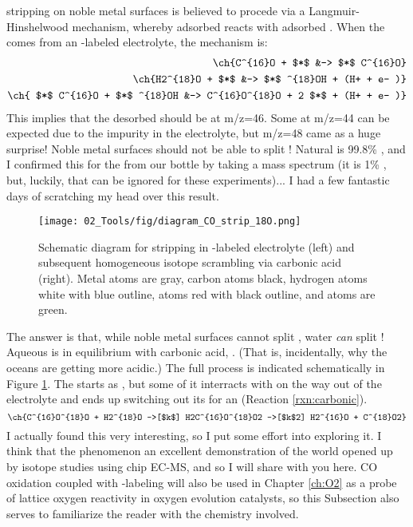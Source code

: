 stripping on noble metal surfaces is believed to procede via a Langmuir-Hinshelwood mechanism\cite{Mayrhofer2005, Koper2009}, whereby adsorbed  reacts with adsorbed . When the  comes from an -labeled electrolyte, the mechanism is:
\begin{align}
\ch{C^{16}O + $*$ &-> $*$ C^{16}O}\\
\ch{H2^{18}O + $*$ &-> $*$ ^{18}OH + (H+ + e- )}\\
\ch{ $*$ C^{16}O +  $*$ ^{18}OH &-> C^{16}O^{18}O + 2 $*$ + (H+ + e- )}
\end{align}
This implies that the  desorbed should be  at m/z=46. Some  at m/z=44 can be expected due to the  impurity in the electrolyte, but m/z=48 came as a huge surprise! Noble metal surfaces should not be able to split \cite{Bernasek1975}!  Natural  is 99.8\% , and I confirmed this for the  from our bottle by taking a mass spectrum (it is 1\% , but, luckily, that can be ignored for these experiments)... I had a few fantastic days of scratching my head over this result.
\begin{figure}[h!]
	\centering
	\texttt{[image: 02\_Tools/fig/diagram\_CO\_strip\_18O.png]}
	\caption{Schematic diagram for  stripping in -labeled electrolyte (left) and subsequent homogeneous isotope scrambling via carbonic acid (right). Metal atoms are gray, carbon atoms black, hydrogen atoms white with blue outline,  atoms red with black outline, and  atoms are green.}
	\label{fig:diagram_CO_18O}
\end{figure}
The answer is that, while noble metal surfaces cannot split , water \textit{can} split ! Aqueous  is in equilibrium with carbonic acid, . (That is, incidentally, why the oceans are getting more acidic.) The full process is indicated schematically in Figure \ref{fig:diagram_CO_18O}. The  starts as , but some of it interracts with  on the way out of the electrolyte and ends up switching out its  for an  (Reaction \ref{rxn:carbonic}).
\begin{equation}
\ch{C^{16}O^{18}O + H2^{18}O ->[$k$] H2C^{16}O^{18}O2 ->[$k$2] H2^{16}O + C^{18}O2}\label{rxn:carbonic}
\end{equation}
I actually found this very interesting, so I put some effort into exploring it. I think that the phenomenon an excellent demonstration of the world opened up by isotope studies using chip EC-MS, and so I will share with you here. CO oxidation coupled with -labeling will also be used in Chapter \ref{ch:O2} as a probe of lattice oxygen reactivity in oxygen evolution catalysts, so this Subsection also serves to familiarize the reader with the chemistry involved.

